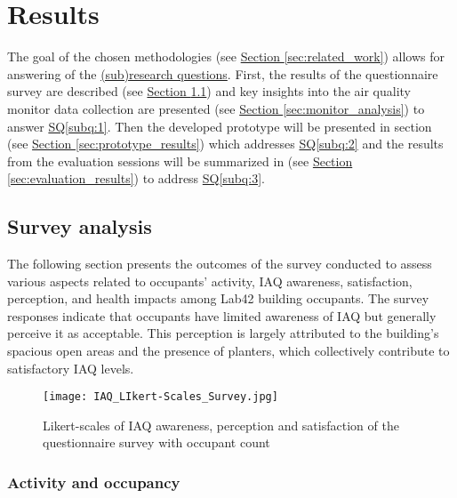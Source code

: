 \section{Results}
\label{sec:results}

The goal of the chosen methodologies (see \hyperref[sec:related_work]{Section \ref*{sec:related_work}}) allows for answering of the \hyperref[rq:1]{(sub)research questions}. First, the results of the questionnaire survey are described (see \hyperref[sec:survey_analysis]{Section \ref*{sec:survey_analysis}}) and key insights into the air quality monitor data collection are presented (see \hyperref[sec:monitor_analysis] {Section \ref*{sec:monitor_analysis}}) to answer \hyperref[subq:1]{SQ\ref*{subq:1}}. Then the developed prototype will be presented in section (see \hyperref[sec:prototype_results]{Section \ref*{sec:prototype_results}}) which addresses \hyperref[subq:2]{SQ\ref*{subq:2}} and the results from the evaluation sessions will be summarized in (see \hyperref[sec:evaluation_results]{Section \ref*{sec:evaluation_results}}) to address \hyperref[subq:3]{SQ\ref*{subq:3}}.

\subsection{Survey analysis}
\label{sec:survey_analysis}

The following section presents the outcomes of the survey conducted to assess various aspects related to occupants' activity, IAQ awareness, satisfaction, perception, and health impacts among Lab42 building occupants. The survey responses indicate that occupants have limited awareness of IAQ but generally perceive it as acceptable. This perception is largely attributed to the building's spacious open areas and the presence of planters, which collectively contribute to satisfactory IAQ levels.

\begin{figure}[H]
    \centering
    \texttt{[image: IAQ\_LIkert-Scales\_Survey.jpg]}
    \caption{Likert-scales of IAQ awareness, perception and satisfaction of the questionnaire survey with occupant count}
    \label{fig:likert-scales-survey}
\end{figure}

\subsubsection{Activity and occupancy}

